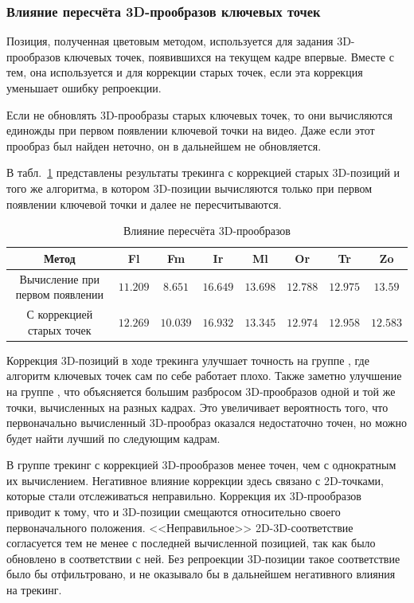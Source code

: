 \subsubsection{Влияние пересчёта 3D-прообразов ключевых точек}

Позиция, полученная цветовым методом, используется для задания 3D-прообразов
ключевых точек, появившихся на текущем кадре впервые.
Вместе с тем, она используется и для коррекции старых точек, если эта коррекция
уменьшает ошибку репроекции.

Если не обновлять 3D-прообразы старых ключевых точек, то они вычисляются
единожды при первом появлении ключевой точки на видео.
Даже если этот прообраз был найден неточно, он в дальнейшем не обновляется.

В табл.~\ref{tab:reprojection} представлены результаты трекинга с коррекцией
старых 3D-позиций и того же алгоритма, в котором 3D-позиции вычисляются
только при первом появлении ключевой точки и далее не пересчитываются.

\begin{table}[h]
\caption{\label{tab:reprojection}Влияние пересчёта 3D-прообразов}
\begin{center}
\begin{tabular}{|c|c|c|c|c|c|c|c|}
\hline
Метод & Fl & Fm & Ir & Ml & Or & Tr & Zo \\
\hline
Вычисление при первом появлении & $11.209$ & $8.651$ & $16.649$ &
$\mathbf{13.698}$ & $12.788$ & $\mathbf{12.975}$ &
$\mathbf{13.59}$ \\
\hline
С коррекцией старых точек & $\mathbf{12.269}$ & $\mathbf{10.039}$ &
$\mathbf{16.932}$ & $13.345$ &
$\mathbf{12.974}$ &
$12.958$ & $12.583$ \\
\hline
\end{tabular}
\end{center}
\end{table}

Коррекция 3D-позиций в ходе трекинга улучшает точность на группе , где алгоритм ключевых точек сам по себе работает плохо.
Также заметно улучшение на группе , что объясняется
большим разбросом 3D-прообразов одной и той же точки, вычисленных на разных
кадрах.
Это увеличивает вероятность того, что первоначально вычисленный 3D-прообраз
оказался недостаточно точен, но можно будет найти лучший по следующим кадрам.

В группе  трекинг с коррекцией 3D-прообразов менее точен, чем с
однократным их вычислением.
Негативное влияние коррекции здесь связано с 2D-точками, которые
стали отслеживаться неправильно.
Коррекция их 3D-прообразов приводит к тому, что и 3D-позиции смещаются
относительно своего первоначального положения.
<<Неправильное>> 2D-3D-соответствие согласуется тем не менее с последней
вычисленной позицией, так как было обновлено в соответствии с ней.
Без репроекции 3D-позиции такое соответствие было бы отфильтровано, и не
оказывало бы в дальнейшем негативного влияния на трекинг.

